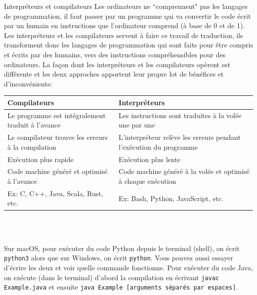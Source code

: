 \begin{section}{Interpréteurs et compilateurs}
    Les ordinateurs ne ``comprennent" pas les langages de programmation, il faut passer par un programme qui va convertir le code écrit par un humain en instructions que l'ordinateur comprend (à base de 0 et de 1).
\\
Les interpréteurs et les compilateurs servent à faire ce travail de traduction, ils transforment donc les langages de programmation qui sont faits pour être compris et écrits par des humains, vers des instructions compréhensibles pour des ordinateurs.
La façon dont les interpréteurs et les compilateurs opèrent est différente et les deux approches apportent leur propre lot de bénéfices et d'inconvénients: \newline 
    
\begin{tabular}{| C{0.45\textwidth} | C{0.45\textwidth} |} 
        \hline
        \textbf{Compilateurs} & \textbf{Interpréteurs}\\ [0.5ex]
        \hline
        Le programme est intégralement traduit à l'avance & Les instructions sont traduites à la volée une par une  \\
        \hline
        Le compilateur trouve les erreurs à la compilation & L'interpréteur relève les erreurs pendant l'exécution du programme  \\
        \hline
        Exécution plus rapide & Exécution plus lente \\
        \hline
        Code machine généré et optimisé à l'avance & Code machine généré à la volée et optimisé à chaque exécution  \\
        \hline
        Ex: C, C++, Java, Scala, Rust, etc. & Ex: Bash, Python, JavaScript, etc. \\
        \hline
    \end{tabular}
    \\\\
    \begin{attention}
    Sur macOS, pour exécuter du code Python depuis le terminal (shell), on écrit \texttt{python3} alors que sur Windows, on écrit \texttt{python}. Vous pouvez aussi essayer d'écrire les deux et voir quelle commande fonctionne. Pour exécuter du code Java, on exécute (dans le terminal) d'abord la compilation en écrivant \texttt{javac Example.java} et ensuite \texttt{java Example [arguments séparés par espaces]}.
\end{attention}
    \begin{Exercice}[10 minutes]

\end{Exercice}
\end{section}
